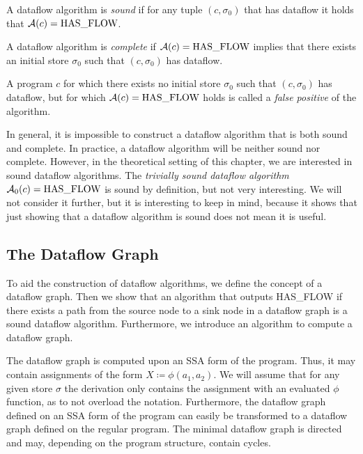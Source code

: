 \begin{definition}[Soundness]
    A dataflow algorithm is \emph{sound} if for any tuple $(c, \sigma_0)$ that
    has dataflow it holds that $\operatorname{\mathcal{A}}(c) = \text{HAS\_FLOW}$.
\end{definition}

\begin{definition}[Completeness]
    A dataflow algorithm is \emph{complete} if $\operatorname{\mathcal{A}}(c) = \text{HAS\_FLOW}$
    implies that there exists an initial store $\sigma_0$
     such that $(c, \sigma_0)$ has dataflow.
\end{definition}
\begin{definition}
    A program $c$ for which there exists no initial store $\sigma_0$ such that 
    $(c, \sigma_0)$ has dataflow, but for which $\operatorname{\mathcal{A}}(c) = \text{HAS\_FLOW}$ holds
    is called a \emph{false positive} of the algorithm.
\end{definition}
\begin{remark}
    In general, it is impossible to construct a dataflow algorithm that is both 
    sound and complete.
    In practice, a dataflow algorithm will be neither sound nor complete.
    However, in the theoretical setting of this chapter, we are interested in 
    sound dataflow algorithms.
    The \emph{trivially sound dataflow algorithm} $\operatorname{\mathcal{A}}_0(c) = \text{HAS\_FLOW}$ 
    is sound by definition, but not very interesting.
    We will not consider it further, but it is interesting to keep in mind,
    because it shows that just showing that a dataflow algorithm is sound does not
    mean it is useful.    
\end{remark}

\subsection{The Dataflow Graph}
To aid the construction of dataflow algorithms, we define the concept
of a dataflow graph.
Then we show that an algorithm that outputs HAS\_FLOW if 
there exists a path from the source 
node to a sink node in a dataflow graph %
is a sound dataflow algorithm.
Furthermore, we introduce an algorithm to compute a dataflow graph.

The dataflow graph is computed upon an SSA form of the program.
Thus, it may contain assignments of the form $X \coloneqq \phi(a_1, a_2)$.
We will assume that for any given store $\sigma$ the derivation only contains 
the assignment with an evaluated $\phi$ function, as to not overload the notation.
Furthermore, the dataflow graph defined on an SSA form of the program can easily 
be transformed to a dataflow graph defined on the regular program.
The minimal dataflow graph is directed and may, depending on the 
program structure, contain cycles.

